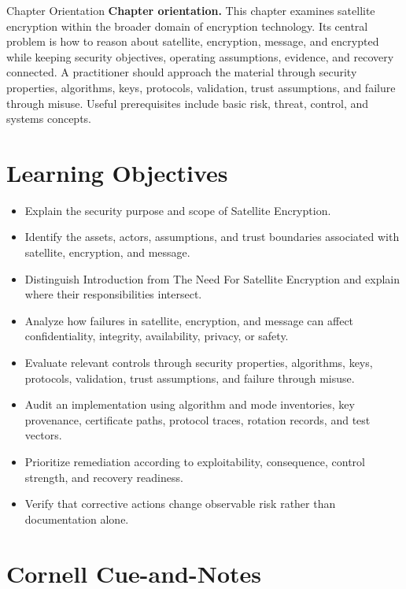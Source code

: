 \documentclass[11pt,letterpaper]{article}
\title{\CornellDocumentTitle}
\author{}
\date{}
\begin{document}
\maketitle
\begin{CornellOverviewBox}{Chapter Orientation}
\textbf{Chapter orientation.} This chapter examines satellite encryption within the broader domain of encryption technology. Its central problem is how to reason about satellite, encryption, message, and encrypted while keeping security objectives, operating assumptions, evidence, and recovery connected. A practitioner should approach the material through security properties, algorithms, keys, protocols, validation, trust assumptions, and failure through misuse. Useful prerequisites include basic risk, threat, control, and systems concepts.
\end{CornellOverviewBox}
\section*{Learning Objectives}
\begin{itemize}
\item Explain the security purpose and scope of Satellite Encryption.
\item Identify the assets, actors, assumptions, and trust boundaries associated with satellite, encryption, and message.
\item Distinguish Introduction from The Need For Satellite Encryption and explain where their responsibilities intersect.
\item Analyze how failures in satellite, encryption, and message can affect confidentiality, integrity, availability, privacy, or safety.
\item Evaluate relevant controls through security properties, algorithms, keys, protocols, validation, trust assumptions, and failure through misuse.
\item Audit an implementation using algorithm and mode inventories, key provenance, certificate paths, protocol traces, rotation records, and test vectors.
\item Prioritize remediation according to exploitability, consequence, control strength, and recovery readiness.
\item Verify that corrective actions change observable risk rather than documentation alone.
\end{itemize}
\section*{Cornell Cue-and-Notes}
\end{document}
